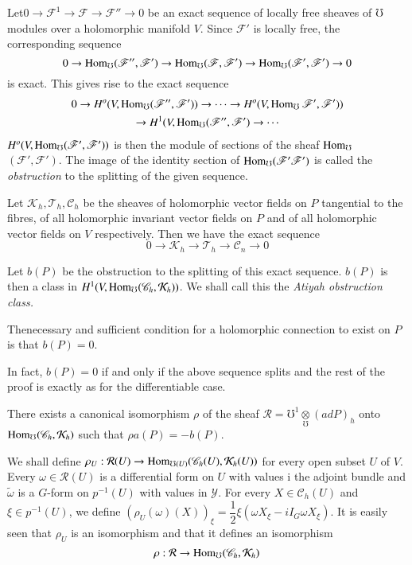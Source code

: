 Let\pageoriginale $0 \to \mathscr{F}^1 \to \mathscr{F} \to
\mathscr{F}'' \to 0$ be 
an exact sequence of locally free sheaves of $\mho$ modules over a
holomorphic manifold $V$. Since $\mathscr{F}'$ is locally free, the
corresponding sequence 
$$
0 \to \operatorname{Hom}_\mho (\mathscr{F}'' , \mathscr{F}') \to \operatorname{Hom}_\mho
(\mathscr{F},\mathscr{F}') \to \operatorname{Hom}_\mho (\mathscr{F}', \mathscr{F}')
\to 0 
$$
is exact. This gives rise to the exact sequence  
\begin{gather*}
0 \to H^o (V, \operatorname{Hom}_\mho (\mathscr{F}'', \mathscr{F}')) \to \cdots \to
H^o (V, \operatorname{Hom}_\mho \mathscr{F}',\mathscr{F}')) \\
\to H^1 (V, \operatorname{Hom}_\mho (\mathscr{F}'', \mathscr{F}') \to \cdots 
\end{gather*}
$H^o (V, \operatorname{Hom}_\mho (\mathscr{F}', \mathscr{F}'))$ is then the module of
sections of the sheaf $\operatorname{Hom}_\mho$ $(\mathscr{F}',\mathscr{F}')$. The
image of the identity section of $\operatorname{Hom}_\mho (\mathscr{F}'\mathscr{F}')$
is called the \textit{obstruction} to the splitting of the given
sequence. 

Let $\mathcal{K}_h, \mathscr{T}_h, \mathscr{C}_h$ be the sheaves of
holomorphic vector fields on $P$ tangential to the fibres, of all
holomorphic invariant vector fields on $P$ and of all holomorphic
vector fields on $V$ respectively. Then we have the exact sequence 
$$
0 \to \mathcal{K}_h \to \mathscr{T}_h \to \mathscr{C}_n \to 0
$$

Let $b(P)$ be the obstruction to the splitting of this exact
sequence. $b(P)$ is then a class in $H^1 (V, \operatorname{Hom}_\mho (\mathscr{C}_h,
\mathcal{K}_h))$. We shall call this the \textit{Atiyah obstruction
  class.} 

\begin{theorem}\label{chap6:sec7:thm2}%
  The\pageoriginale necessary and sufficient condition for a holomorphic connection
  to exist on $P$ is that $b(P) = 0$. 
\end{theorem}

In fact, $b(P) = 0$ if and only if the above sequence splits and the
rest of the proof is exactly as for the differentiable case. 

\begin{theorem}\label{chap6:sec7:thm3}%
  There exists a canonical isomorphism $\rho$ of the sheaf
  $\mathcal{R} = \mho^1 \underset{\mho}\otimes (ad P)_h$ onto
  $\operatorname{Hom}_\mho (\mathscr{C}_h , \mathcal{K}_h)$ such that $\rho a (P) = -
  b(P)$. 
\end{theorem}

We shall define $\rho _U  : \mathcal{R} (U) \to \operatorname{Hom}_{\mho (U)}
(\mathscr{C}_h (U), \mathcal{K}_h (U))$ for every open subset $U$ of
$V$. Every $\omega \in \mathcal{R}(U)$ is a differential form on $U$
with values i the adjoint bundle and $\tilde{\omega}$ is a $G$-form on
$p^{-1}(U)$ with values in $\mathscr{Y}$. For every $X \in
\mathscr{C}_h (U)$ and $\xi \in p^{-1}(U)$, we define $(\rho_U
(\omega) (X))_\xi = \dfrac{1}{2} \xi (\omega X_\xi - iI_G \omega
X_\xi)$. It is easily seen that $\rho_U$ is an isomorphism and that it
defines an isomorphism 
$$
\rho : \mathcal{R}\to \operatorname{Hom}_\mho (\mathscr{C}_h, \mathcal{K}_h)
$$

